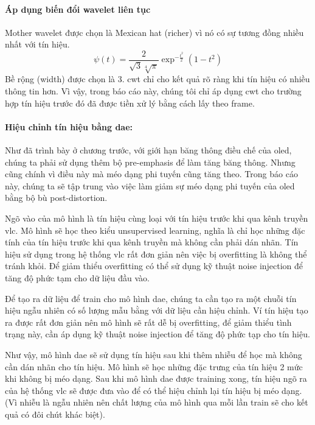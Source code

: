 \paragraph{Áp dụng biến đổi wavelet liên tục}
Mother wavelet được chọn là Mexican hat (richer) vì nó có sự tương đồng nhiều nhất với tín hiệu.
\begin{equation}
\psi(t) = \frac{2}{\sqrt{3} \sqrt[4]{\pi}} \exp^{-\frac{t^2}{2}} \left( 1 - t^2 \right)
\end{equation}
Bề rộng (width) được chọn là 3.
\ac{cwt} chỉ cho kết quả rõ ràng khi tín hiệu có nhiều thông tin hơn. Vì vậy, trong báo cáo này, chúng tôi chỉ áp dụng \ac{cwt} cho trường hợp tín hiệu trước đó đã được tiền xử lý bằng cách lấy theo frame.

\paragraph{Hiệu chỉnh tín hiệu bằng \ac{dae}:}

Như đã trình bày ở chương trước, với giới hạn băng thông điều chế của \ac{oled}, chúng ta phải sử dụng thêm bộ pre-emphasis để làm tăng băng thông. Nhưng cũng chính vì điều này mà méo dạng phi tuyến cũng tăng theo. 
Trong báo cáo này, chúng ta sẽ tập trung vào việc làm giảm sự méo dạng phi tuyến của \ac{oled} bằng bộ bù post-distortion. 

Ngõ vào của mô hình là tín hiệu cùng loại với tín hiệu trước khi qua kênh truyền \ac{vlc}. Mô hình sẽ học theo kiểu unsupervised learning, nghĩa là chỉ học những đặc tính của tín hiệu trước khi qua kênh truyền mà không cần phải dán nhãn. Tín hiệu sử dụng trong hệ thống \ac{vlc} rất đơn giản nên việc bị overfitting là không thể tránh khỏi. Để giảm thiểu overfitting có thể sử dụng kỹ thuật noise injection để tăng độ phức tạm cho dữ liệu đầu vào. 

Để tạo ra dữ liệu để train cho mô hình \ac{dae}, chúng ta cần tạo ra một chuỗi tín hiệu ngẫu nhiên có số lượng mẫu bằng với dữ liệu cần hiệu chỉnh. Ví tín hiệu tạo ra được rất đơn giản nên mô hình sẽ rất dễ bị overfitting, để giảm thiểu tình trạng này, cần áp dụng kỹ thuật noise injection để tăng độ phức tạp cho tín hiệu.

Như vậy, mô hình \ac{dae} sẽ sử dụng tín hiệu sau khi thêm nhiễu để học mà không cần dán nhãn cho tín hiệu. Mô hình sẽ học những đặc trưng của tín hiệu 2 mức khi không bị méo dạng. 
Sau khi mô hình \ac{dae} được training xong, tín hiệu ngõ ra của hệ thống \ac{vlc} sẽ được đưa vào để có thể hiệu chỉnh lại tín hiệu bị méo dạng. (Vì nhiễu là ngẫu nhiên nên chất lượng của mô hình qua mỗi lần train sẽ cho kết quả có đôi chút khác biệt).

